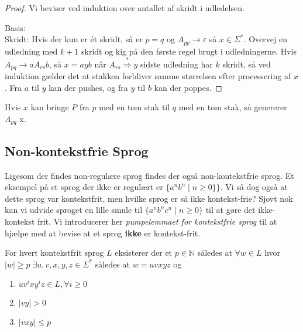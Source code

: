 \begin{proof}
Vi beviser ved induktion over antallet af skridt i udledelsen.

Basis:\\ %
 Skridt: Hvis der kun er ét skridt, så er $p = q$ og $A_{pp} \rightarrow \varepsilon$ så $x \in \Sigma^{*}$.
Overvej en udledning med $k+1$ skridt og kig på den første regel brugt i udledningerne. Hvis $A_{pq} \rightarrow aA_{rs}b$, så $x = ayb$ når $A_{rs} \stackrel{*}{\Rightarrow} y$ sidste udledning har $k$ skridt, så ved induktion gælder det at stakken forbliver samme størrelsen efter processering af $x$. Fra $a$ til $y$ kan der pushes, og fra $y$ til $b$ kan der poppes.
\end{proof}

\begin{claim}
Hvis $x$ kan bringe $P$ fra $p$ med en tom stak til $q$ med en tom stak, så genererer $A_{pq}$ x.
\end{claim}




\newpage
\subsection{Non-kontekstfrie Sprog}%
\label{subsec:noncfl}

Ligesom der findes non-regulære sprog findes der også non-kontekstfrie sprog. Et eksempel på et sprog der ikke er regulært er $\{a^{n}b^{n} \;|\; n \ge 0\}\}$. Vi så dog også at dette sprog var kontekstfrit, men hvilke sprog er så ikke kontekst-frie? Sjovt nok kan vi udvide sproget en lille smule til $\{a^{n}b^{n}c^{n} \;|\; n \ge 0\}$ til at gøre det ikke-kontekst frit. Vi introducerer her \textit{pumpelemmaet for kontekstfrie sprog} til at hjælpe med at bevise at et sprog \textbf{ikke} er kontekst-frit.

\begin{theorem}
  \label{teo:pumpelemmacfg}
  For hvert kontekstfrit sprog $L$ eksisterer der et $p \in \mathbb{N}$ således at $\forall w \in L$ hvor $|w| \geq p\; \exists u,v,x,y,z \in \Sigma^{*}$ således at $w = uvxyz$ og
  \begin{enumerate}
    \item $uv^{i}xy^{i}z \in L, \forall i \ge 0$
    \item $|vy| > 0$
    \item $|vxy| \le p$
  \end{enumerate}
\end{theorem}

